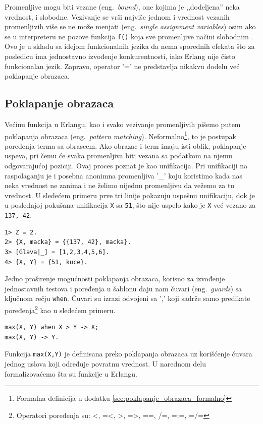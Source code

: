 \documentclass[a4paper]{article}
\begin{document}
Promenljive mogu biti vezane (eng.~{\em bound}), one kojima je ,,dodeljena'' neka vrednost, i slobodne. 
Vezivanje se vrši najviše jednom i vrednost vezanih promenljivih više se ne može menjati (eng.~{\em single assignment variables}) 
osim ako se u interpreteru ne pozove funkcija  {\texttt{f()}} koja sve promenljive načini slobodnim \cite{book_fred}. 
Ovo je u skladu sa idejom funkcionalnih jezika da nema sporednih efekata 
što za posledicu ima jednostavno izvođenje konkurentnosti, 
iako Erlang nije čisto funkcionalan jezik.
Zapravo, operator '=' ne predstavlja nikakvu dodelu već poklapanje obrazaca.


\subsection{Poklapanje obrazaca}
Većinu funkcija u Erlangu, kao i svako vezivanje promenljivih pišemo putem poklapanja obrazaca (eng.~{\em pattern matching}). Neformalno\footnote{ Formalna definicija u dodatku \ref{sec:poklapanje_obrazaca_formalno}}, to je postupak poređenja terma sa obrascem. Ako obrazac i term imaju isti oblik, poklapanje uspeva, pri čemu će svaka promenljiva biti vezana sa podatkom na njemu odgovarajućoj poziciji. 
Ovaj proces poznat je kao unifikacija. 
Pri unifikaciji na raspolaganju je i posebna anonimna promenljiva '\_' koju koristimo kada nas neka vrednost ne zanima i ne želimo nijednu promenljivu da vežemo za tu vrednost. U sledećem primeru prve tri linije pokazuju uspešnu unifikaciju, dok je u poslednjoj pokušana unifikacija {\texttt{X}} sa {\texttt{51}}, što nije uspelo kako je {\texttt{X}} već vezano za {\texttt{{137, 42}}}.

\begin{verbatim}
1> Z = 2.
2> {X, macka} = {{137, 42}, macka}.
3> [Glava|_] = [1,2,3,4,5,6].
4> {X, Y} = {51, kuce}.
\end{verbatim}

Jedno proširenje mogućnosti poklapanja obrazaca, korisno za izvođenje jednostavnih testova i poređenja u šablonu daju nam čuvari (eng.~{\em guards}) sa ključnom rečju {\texttt{when}}. Čuvari su izrazi odvojeni sa ',' koji sadrže samo predikate poređenja\footnote{ Operatori poređenja su: <, =<, >, =>, ==, /=, =:=, =/=} kao u sledećem primeru.
\begin{verbatim}
max(X, Y) when X > Y -> X;
max(X, Y) -> Y.
\end{verbatim}
Funkcija {\texttt{max(X,Y)}} je definisana preko poklapanja obrazaca uz korišćenje čuvara jednog uslova koji određuje povratnu vrednost. U narednom delu formalizovaćemo šta su funkcije u Erlangu.
\end{document}
